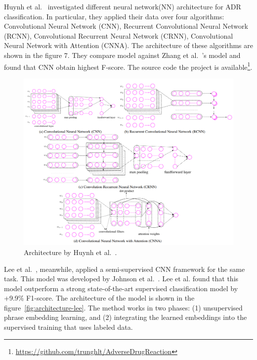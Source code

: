 Huynh et al.~\cite{huynh2016adverse} investigated different neural network(NN) architecture for ADR classification. In particular, they applied their data over four algorithms: Convolutional Neural Network (CNN), Recurrent Convolutional Neural Network (RCNN), Convolutional Recurrent Neural Network (CRNN), Convolutional Neural Network with Attention (CNNA). The architecture of these algorithms are shown in the figure 7. They compare model against Zhang et al.~\cite{zhang2016ensemble}’s model and found that CNN obtain highest F-score. The source code the project is available\footnote{\url{https://github.com/trunghlt/AdverseDrugReaction}}.

\begin{figure}[h]
	\centering
	\includegraphics[width=0.99\linewidth]{Figures/e.png}
	\caption{Architecture by Huynh et al.~\cite{huynh2016adverse}.}
	\label{fig:architecture-huynh}
\end{figure}

Lee et al.~\cite{lee2017adverse}, meanwhile, applied a semi-supervised CNN framework for the same task. This model was developed by Johnson et al.~\cite{johnson2015semi}. Lee et al. found that this model outperform a strong state-of-the-art supervised classification model by +9.9\% F1-score. The architecture of the model is shown in the figure~\ref{fig:architecture-lee}. The method works in two phases: (1) unsupervised phrase embedding learning, and (2) integrating the learned embeddings into the supervised training that uses labeled data.

